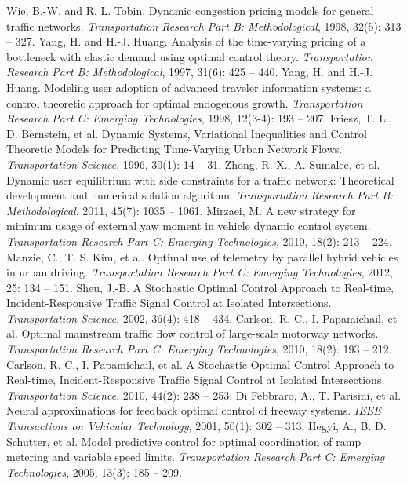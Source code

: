 \documentclass[12pt,onecolumn,twoside]{JCTA}
\theoremstyle{mystyle}
\begin{document}
\begin{thebibliography}{99}
Wie, B.-W. and R. L. Tobin. Dynamic congestion pricing models for general traffic networks. \textit{Transportation Research Part B: Methodological}, 1998, 32(5): 313 -- 327.
Yang, H. and H.-J. Huang. Analysis of the time-varying pricing of a bottleneck with elastic demand using optimal control theory. \textit{Transportation Research Part B: Methodological}, 1997, 31(6): 425 -- 440.
Yang, H. and H.-J. Huang. Modeling user adoption of advanced traveler information systems: a control theoretic approach for optimal endogenous growth. \textit{Transportation Research Part C: Emerging Technologies}, 1998, 12(3-4): 193 -- 207.
Friesz, T. L., D. Bernstein, et al. Dynamic Systems, Variational Inequalities and Control Theoretic Models for Predicting Time-Varying Urban Network Flows. \textit{Transportation Science}, 1996, 30(1): 14 -- 31.
Zhong, R. X., A. Sumalee, et al. Dynamic user equilibrium with side constraints for a traffic network: Theoretical development and numerical solution algorithm. \textit{Transportation Research Part B: Methodological}, 2011, 45(7): 1035 -- 1061.
Mirzaei, M. A new strategy for minimum usage of external yaw moment in vehicle dynamic control system. \textit{Transportation Research Part C: Emerging Technologies}, 2010, 18(2): 213 -- 224.
Manzie, C., T. S. Kim, et al. Optimal use of telemetry by parallel hybrid vehicles in urban driving. \textit{Transportation Research Part C: Emerging Technologies}, 2012, 25: 134 -- 151.
Sheu, J.-B. A Stochastic Optimal Control Approach to Real-time, Incident-Responsive Traffic Signal Control at Isolated Intersections. \textit{Transportation Science}, 2002, 36(4): 418  -- 434.
Carlson, R. C., I. Papamichail, et al. Optimal mainstream traffic flow control of large-scale motorway networks. \textit{Transportation Research Part C: Emerging Technologies}, 2010, 18(2): 193 -- 212.
Carlson, R. C., I. Papamichail, et al. A Stochastic Optimal Control Approach to Real-time, Incident-Responsive Traffic Signal Control at Isolated Intersections. \textit{Transportation Science}, 2010, 44(2): 238  -- 253.
Di Febbraro, A., T. Parisini, et al. Neural approximations for feedback optimal control of freeway systems. \textit{IEEE Transactions on Vehicular Technology}, 2001, 50(1): 302   -- 313.
Hegyi, A., B. D. Schutter, et al. Model predictive control for optimal coordination of ramp metering and variable speed limits. \textit{Transportation Research Part C: Emerging Technologies}, 2005, 13(3): 185 -- 209.

\end{thebibliography}
\end{document}
